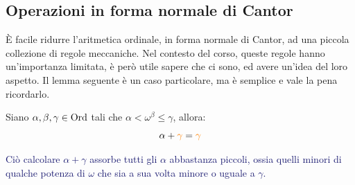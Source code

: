 \subsection{Operazioni in forma normale di Cantor}
\`E facile ridurre l'aritmetica ordinale, in forma normale di Cantor, ad una piccola collezione di regole meccaniche.
Nel contesto del corso, queste regole hanno un'importanza limitata, \`e per\`o utile sapere che ci sono, ed avere un'idea del loro aspetto.
Il lemma seguente \`e un caso particolare, ma \`e semplice e vale la pena ricordarlo.

\begin{lemma}
	Siano $\alpha,\beta,\gamma \in \operatorname{Ord}$ tali che $\alpha < \omega^{\beta} \leq \gamma$, allora:
	\[ \alpha + \textcolor{orange}{\gamma} = \textcolor{orange}{\gamma}
		\]
\end{lemma}

\textcolor{MidnightBlue}{Ci\`o calcolare $\alpha + \gamma$ assorbe tutti gli $\alpha$ abbastanza piccoli, ossia quelli minori di qualche potenza di $\omega$ che sia a sua volta minore o uguale a $\gamma$.}

